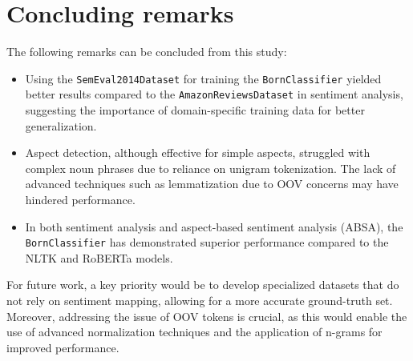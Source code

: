 
\section{Concluding remarks}\label{sec4}

The following remarks can be concluded from this study:
\begin{itemize}
    \item Using the \texttt{SemEval2014Dataset} for training the \texttt{BornClassifier} yielded better results compared to the \texttt{AmazonReviewsDataset} in sentiment analysis, suggesting the importance of domain-specific training data for better generalization.

    \item Aspect detection, although effective for simple aspects, struggled with complex noun phrases due to reliance on unigram tokenization. The lack of advanced techniques such as lemmatization due to OOV concerns may have hindered performance.

    \item In both sentiment analysis and aspect-based sentiment analysis (ABSA), the \texttt{BornClassifier} has demonstrated superior performance compared to the NLTK and RoBERTa models.
\end{itemize}

For future work, a key priority would be to develop specialized datasets that do not rely on sentiment mapping, allowing for a more accurate ground-truth set. Moreover, addressing the issue of OOV tokens is crucial, as this would enable the use of advanced normalization techniques and the application of n-grams for improved performance.\newpage